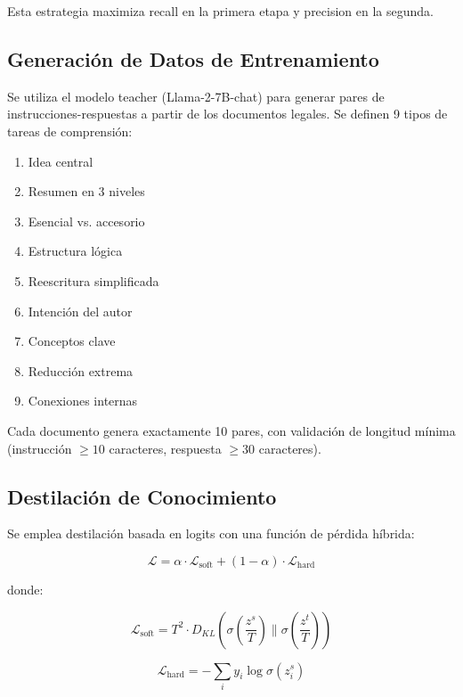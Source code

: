\documentclass[conference]{IEEEtran}
\begin{document}
Esta estrategia maximiza recall en la primera etapa y precision en la segunda.

\subsection{Generaci\'on de Datos de Entrenamiento}
\label{sec:datagen}

Se utiliza el modelo teacher (Llama-2-7B-chat) para generar pares de instrucciones-respuestas a partir de los documentos legales. Se definen 9 tipos de tareas de comprensi\'on:

\begin{enumerate}
    \item Idea central
    \item Resumen en 3 niveles
    \item Esencial vs. accesorio
    \item Estructura l\'ogica
    \item Reescritura simplificada
    \item Intenci\'on del autor
    \item Conceptos clave
    \item Reducci\'on extrema
    \item Conexiones internas
\end{enumerate}

Cada documento genera exactamente 10 pares, con validaci\'on de longitud m\'inima (instrucci\'on $\geq 10$ caracteres, respuesta $\geq 30$ caracteres).

\subsection{Destilaci\'on de Conocimiento}
\label{sec:distillation}

Se emplea destilaci\'on basada en logits con una funci\'on de p\'erdida h\'ibrida:

\begin{equation}
    \mathcal{L} = \alpha \cdot \mathcal{L}_{\text{soft}} + (1 - \alpha) \cdot \mathcal{L}_{\text{hard}}
    \label{eq:loss}
\end{equation}

donde:

\begin{equation}
    \mathcal{L}_{\text{soft}} = T^2 \cdot D_{KL}\left(\sigma\left(\frac{z^s}{T}\right) \Big\| \sigma\left(\frac{z^t}{T}\right)\right)
\end{equation}

\begin{equation}
    \mathcal{L}_{\text{hard}} = -\sum_{i} y_i \log \sigma(z^s_i)
\end{equation}
\end{document}
